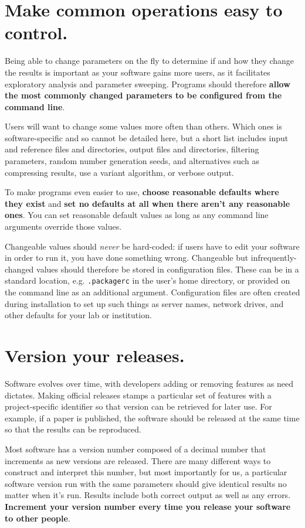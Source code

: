 \documentclass[10pt,letterpaper]{article}
\begin{document}
\section{Make common operations easy to control.}

Being able to change parameters on the fly to determine if and how
they change the results is important as your software gains more users,
as it facilitates exploratory analysis and parameter sweeping.
Programs should therefore
\textbf{allow the most commonly changed parameters to be configured from the command line}.

Users will want to change some values more often than others.
Which ones is software-specific and so cannot be detailed here,
but a short list includes input and reference files and directories,
output files and directories,
filtering parameters,
random number generation seeds,
and
alternatives such as compressing results,
use a variant algorithm,
or verbose output.

To make programs even easier to use,
\textbf{choose reasonable defaults where they exist}
and \textbf{set no defaults at all when there aren't any reasonable ones}.
You can set reasonable default values
as long as any command line arguments
override those values.

Changeable values should \emph{never} be hard-coded:
if users have to edit your software in order to run it,
you have done something wrong.
Changeable but infrequently-changed values should therefore be stored in configuration files.
These can be in a standard location,
e.g. \texttt{.packagerc} in the user's home directory,
or provided on the command line as an additional argument.
Configuration files are often created during installation
to set up such things as server names,
network drives,
and other defaults for your lab or institution. 

\section{Version your releases.}

Software evolves over time, with developers adding or removing features as need
dictates. Making official releases stamps a particular set of features with a
project-specific identifier so that version can be retrieved for later use. For
example, if a paper is published, the software should be released at the same
time so that the results can be reproduced. 

Most software has a version number composed of a decimal number that
increments as new versions are released. 
There are many different ways
to construct and interpret this number, but most importantly for us, a
particular software version run with the same parameters should give
identical results no matter when it's run. Results include both correct
output as well as any errors.
\textbf{Increment your version number every time you release your software to
other people}.
\end{document}
